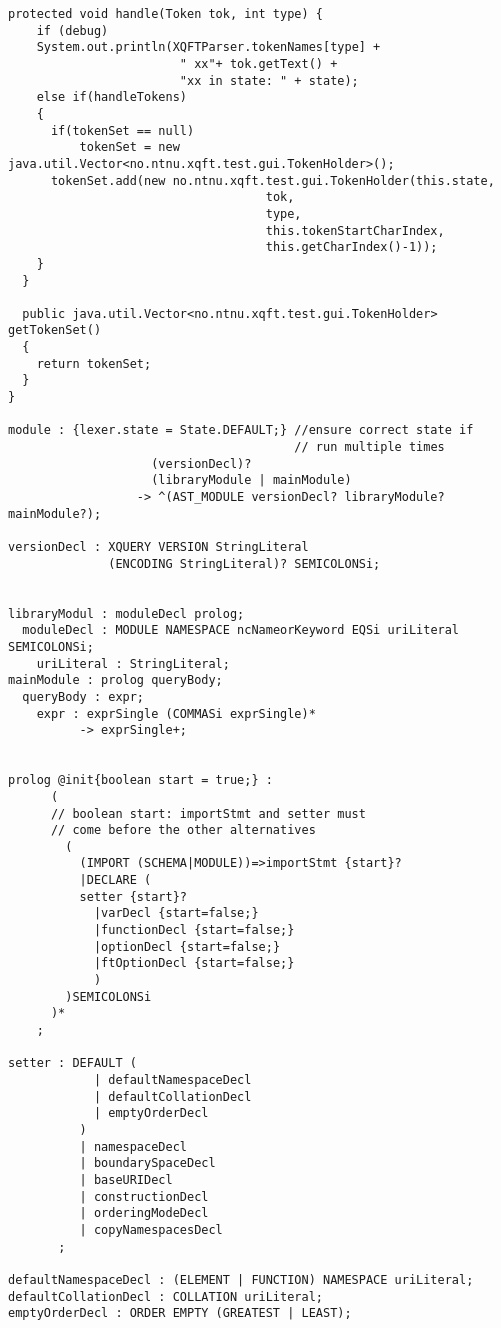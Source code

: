 \begin{Verbatim}[frame=none, fontsize=\footnotesize]
  protected void handle(Token tok, int type) {
    if (debug) 
    System.out.println(XQFTParser.tokenNames[type] + 
                        " xx"+ tok.getText() +
                        "xx in state: " + state);
    else if(handleTokens)
    {
      if(tokenSet == null)
          tokenSet = new java.util.Vector<no.ntnu.xqft.test.gui.TokenHolder>();
      tokenSet.add(new no.ntnu.xqft.test.gui.TokenHolder(this.state,
                                    tok,
                                    type,
                                    this.tokenStartCharIndex,
                                    this.getCharIndex()-1));
    }
  }

  public java.util.Vector<no.ntnu.xqft.test.gui.TokenHolder> getTokenSet()
  {
    return tokenSet;
  }
}

module : {lexer.state = State.DEFAULT;} //ensure correct state if 
                                        // run multiple times
                    (versionDecl)? 
                    (libraryModule | mainModule)
                  -> ^(AST_MODULE versionDecl? libraryModule? mainModule?);

versionDecl : XQUERY VERSION StringLiteral 
              (ENCODING StringLiteral)? SEMICOLONSi;


libraryModul : moduleDecl prolog;
  moduleDecl : MODULE NAMESPACE ncNameorKeyword EQSi uriLiteral SEMICOLONSi;
    uriLiteral : StringLiteral;
mainModule : prolog queryBody;
  queryBody : expr;
    expr : exprSingle (COMMASi exprSingle)* 
          -> exprSingle+;


prolog @init{boolean start = true;} :
      (
      // boolean start: importStmt and setter must 
      // come before the other alternatives
        (
          (IMPORT (SCHEMA|MODULE))=>importStmt {start}?
          |DECLARE (
          setter {start}?
            |varDecl {start=false;}
            |functionDecl {start=false;}
            |optionDecl {start=false;}
            |ftOptionDecl {start=false;}
            )
        )SEMICOLONSi
      )*
    ;

setter : DEFAULT (
            | defaultNamespaceDecl
            | defaultCollationDecl
            | emptyOrderDecl
          )
          | namespaceDecl
          | boundarySpaceDecl
          | baseURIDecl 
          | constructionDecl 
          | orderingModeDecl 
          | copyNamespacesDecl
       ;

defaultNamespaceDecl : (ELEMENT | FUNCTION) NAMESPACE uriLiteral;
defaultCollationDecl : COLLATION uriLiteral;
emptyOrderDecl : ORDER EMPTY (GREATEST | LEAST);


\end{Verbatim}
